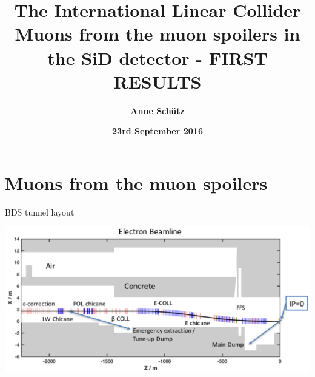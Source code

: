 \documentclass[xcolor={dvipsnames}]{beamer}
\title[ILC \& Muons from spoilers]{\textbf{\LARGE The International Linear Collider \\ \small Muons from the muon spoilers in the SiD detector - FIRST RESULTS}}
\author{\textbf{Anne Sch\"utz}}
\institute{\textbf{DESY}}
\date{\textbf{23rd September 2016}}
\begin{document}
{
\begin{frame}
  \titlepage
\end{frame}
}
\begin{frame}
  \tableofcontents
\end{frame}

\section{Muons from the muon spoilers}
\begin{frame}{BDS tunnel layout}
\begin{center}
\includegraphics[height=0.65\textheight]{BDS_electron_tunnel.pdf}
\end{center}
\end{frame}
\end{document}
